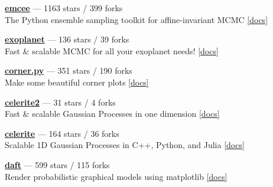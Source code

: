 \item \href{https://github.com/dfm/emcee}{{\bf emcee}} --- 1163 stars / 399 forks \\
The Python ensemble sampling toolkit for affine-invariant MCMC \href{https://emcee.readthedocs.io}{[docs]}

\item \href{https://github.com/exoplanet-dev/exoplanet}{{\bf exoplanet}} --- 136 stars / 39 forks \\
Fast {\&} scalable MCMC for all your exoplanet needs!  \href{https://docs.exoplanet.codes}{[docs]}

\item \href{https://github.com/dfm/corner.py}{{\bf corner.py}} --- 351 stars / 190 forks \\
Make some beautiful corner plots \href{http://corner.readthedocs.io}{[docs]}

\item \href{https://github.com/exoplanet-dev/celerite2}{{\bf celerite2}} --- 31 stars / 4 forks \\
Fast {\&} scalable Gaussian Processes in one dimension \href{https://celerite2.readthedocs.io}{[docs]}

\item \href{https://github.com/dfm/celerite}{{\bf celerite}} --- 164 stars / 36 forks \\
Scalable 1D Gaussian Processes in C++, Python, and Julia \href{http://celerite.rtfd.io}{[docs]}

\item \href{https://github.com/daft-dev/daft}{{\bf daft}} --- 599 stars / 115 forks \\
Render probabilistic graphical models using matplotlib \href{https://docs.daft-pgm.org}{[docs]}